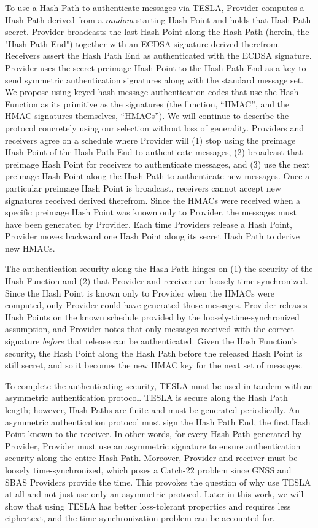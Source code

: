 \documentclass[letterpaper,times]{IONconf/IONconf}
\begin{document}
To use a Hash Path to authenticate messages via TESLA, Provider computes a Hash Path derived from a {\em random} starting Hash Point and holds that Hash Path secret.
Provider broadcasts the last Hash Point along the Hash Path (herein, the "Hash Path End") together with an ECDSA signature derived therefrom.
Receivers assert the Hash Path End as authenticated with the ECDSA signature.
Provider uses the secret preimage Hash Point to the Hash Path End as a key to send symmetric authentication signatures along with the standard message set.
We propose using keyed-hash message authentication codes that use the Hash Function as its primitive as the signatures (the function, ``HMAC'', and the HMAC signatures themselves, ``HMACs''). 
We will continue to describe the protocol concretely using our selection without loss of generality.
Providers and receivers agree on a schedule where Provider will (1) stop using the preimage Hash Point of the Hash Path End to authenticate messages, (2) broadcast that preimage Hash Point for receivers to authenticate messages, and (3) use the next preimage Hash Point along the Hash Path to authenticate new messages.
Once a particular preimage Hash Point is broadcast, receivers cannot accept new signatures received derived therefrom.
Since the HMACs were received when a specific preimage Hash Point was known only to Provider, the messages must have been generated by Provider.
Each time Providers release a Hash Point, Provider moves backward one Hash Point along its secret Hash Path to derive new HMACs.

The authentication security along the Hash Path hinges on (1) the security of the Hash Function and (2) that Provider and receiver are loosely time-synchronized.
Since the Hash Point is known only to Provider when the HMACs were computed, only Provider could have generated those messages.
Provider releases Hash Points on the known schedule provided by the loosely-time-synchronized assumption, and Provider notes that only messages received with the correct signature {\em before} that release can be authenticated.
Given the Hash Function's security, the Hash Point along the Hash Path before the released Hash Point is still secret, and so it becomes the new HMAC key for the next set of messages.

To complete the authenticating security, TESLA must be used in tandem with an asymmetric authentication protocol.
TESLA is secure along the Hash Path length; however, Hash Paths are finite and must be generated periodically.
An asymmetric authentication protocol must sign the Hash Path End, the first Hash Point known to the receiver.
In other words, for every Hash Path generated by Provider, Provider must use an asymmetric signature to ensure authentication security along the entire Hash Path.
Moreover, Provider and receiver must be loosely time-synchronized, which poses a Catch-22 problem since GNSS and SBAS Providers provide the time.
This provokes the question of why use TESLA at all and not just use only an asymmetric protocol.
Later in this work, we will show that using TESLA has better loss-tolerant properties and requires less ciphertext, and the time-synchronization problem can be accounted for.
\end{document}
